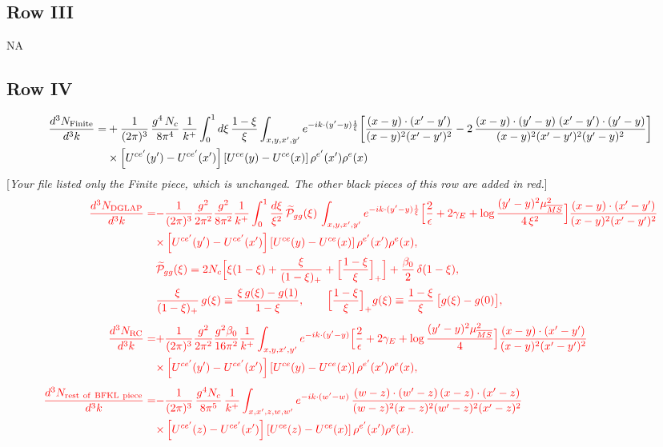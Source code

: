 \documentclass[9pt]{article}
\numberwithin{equation}{section}
\newcommand{\chg}[1]{{\color{red}#1}}
\newcommand{\rnote}[1]{{\color{teal}[\textit{#1}]}}
\begin{document}
\subsection{Row III}
\textsc{NA}
\subsection{Row IV}
\begin{align}
\frac{d^{3}N_{\rm Finite}}{d^{3}k}= &  +\frac{1}{(2\pi)^{3}}\,\frac{g^{4}\,N_{c}}{8\pi^{4}}\,\frac{1}{k^{+}}\int_{0}^{1}d\xi\,\frac{1-\xi}{\xi}\int_{x,y,x',y'}e^{-ik\cdot(y'-y)\frac{1}{\xi}}\bigg[\frac{(x-y)\cdot(x'-y')}{(x-y)^{2}(x'-y')^{2}}-2\,\frac{(x-y)\cdot(y'-y)\;(x'-y')\cdot(y'-y)}{(x-y)^{2}(x'-y')^{2}(y'-y)^{2}}\bigg]\notag\\
&\times\left[U^{ce'}(y') - U^{ce'}(x')\right]\left[U^{ce}(y) - U^{ce}(x)\right]\rho^{e'}(x')\rho^{e}(x)
\end{align}
\rnote{Your file listed only the Finite piece, which is unchanged. The other black pieces of this row are added in red.}
\begin{align}
\chg{\frac{d^{3}N_{\rm DGLAP}}{d^{3}k}=}&\chg{-\frac{1}{(2\pi)^{3}}\frac{g^{2}}{2\pi^{2}}\frac{g^{2}}{8\pi^{2}}\frac{1}{k^{+}}\int_{0}^{1}\frac{d\xi}{\xi^{2}}\,\widetilde{\mathcal P}_{gg}(\xi)\,\int_{x,y,x',y'}e^{-ik\cdot(y'-y)\frac{1}{\xi}}\Big[\frac{2}{\epsilon}+2\gamma_{E}+\log\frac{(y'-y)^{2}\mu^{2}_{\overline{MS}}}{4\,\xi^{2}}\Big]\frac{(x-y)\cdot(x'-y')}{(x-y)^{2}(x'-y')^{2}}}\notag\\
&\chg{\times\left[U^{ce'}(y') - U^{ce'}(x')\right]\left[U^{ce}(y) - U^{ce}(x)\right]\rho^{e'}(x')\rho^{e}(x),}\\
&\chg{\widetilde{\mathcal{P}}_{gg}(\xi) = 2N_{c}\Big[\xi(1-\xi) + \frac{\xi}{(1-\xi)_{+}} + \Big[\frac{1-\xi}{\xi}\Big]_{+}\Big]+\frac{\beta_{0}}{2}\,\delta(1-\xi),}\notag\\
&\chg{\frac{\xi}{(1-\xi)_{+}}\,g(\xi)\equiv\frac{\xi\,g(\xi)-g(1)}{1-\xi},\qquad \Big[\frac{1-\xi}{\xi}\Big]_{+}g(\xi)\equiv\frac{1-\xi}{\xi}\,\big[g(\xi)-g(0)\big],}\notag\\[4pt]
\chg{\frac{d^{3}N_{\rm RC}}{d^{3}k}=}&\chg{+\frac{1}{(2\pi)^{3}}\frac{g^{2}}{2\pi^{2}}\frac{g^{2}\beta_{0}}{16\pi^{2}}\frac{1}{k^{+}}\int_{x,y,x',y'}e^{-ik\cdot(y'-y)}\Big[\frac{2}{\epsilon}+2\gamma_{E}+\log\frac{(y'-y)^{2}\mu^{2}_{\overline{MS}}}{4}\Big]\frac{(x-y)\cdot(x'-y')}{(x-y)^{2}(x'-y')^{2}}}\notag\\
&\chg{\times\left[U^{ce'}(y') - U^{ce'}(x')\right]\left[U^{ce}(y) - U^{ce}(x)\right]\rho^{e'}(x')\rho^{e}(x),}\\[4pt]
\chg{\frac{d^{3}N_{\rm rest\ of\ BFKL\ piece}}{d^{3}k}=}&\chg{-\frac{1}{(2\pi)^{3}}\,\frac{g^{4}N_{c}}{8\pi^{5}}\,\frac{1}{k^{+}}\int_{x,x',z,w,w'}e^{-ik\cdot(w'-w)}\,\frac{(w-z)\cdot (w'-z)\,(x-z)\cdot (x'-z)}{(w-z)^{2}(x-z)^{2}(w'-z)^{2}(x'-z)^{2}}}\notag\\
&\chg{\times\left[U^{ce'}(z) - U^{ce'}(x')\right]\left[U^{ce}(z) - U^{ce}(x)\right]\rho^{e'}(x') \rho^{e}(x).}
\end{align}
\end{document}
